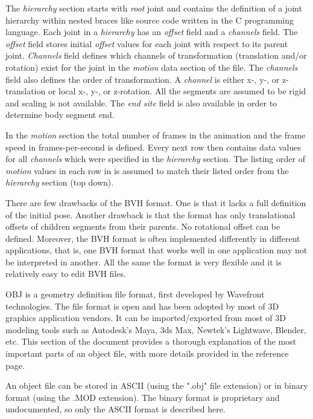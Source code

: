 \documentclass[times, 10pt,twocolumn]{article}
\begin{document}
The \emph{hierarchy} section starts with \emph{root} joint and contains the definition of a joint hierarchy within nested braces like source code written in the C programming language.
Each joint in a \emph{hierarchy} has an \emph{offset} field and a \emph{channels} field.
The \emph{offset} field stores initial \emph{offset} values for each joint with respect to its parent joint.
\emph{Channels} field defines which channels of transformation (translation and/or rotation) exist for the joint in
the \emph{motion} data section of the file. The \emph{channels} field also defines the order of transformation. A
\emph{channel} is either x-, y-, or z-translation or local x-, y-, or z-rotation. All the segments are assumed
to be rigid and scaling is not available.
The \emph{end site} field is also available in order to determine body segment end.

In the \emph{motion} section the total number of frames in the animation and the frame
speed in frames-per-second is defined. Every next row then contains data values for all \emph{channels} which were specified in the \emph{hierarchy} section.
The listing order of \emph{motion} values in each row in is assumed to match their listed order from the \emph{hierarchy} section (top down).

There are few drawbacks of the BVH format. One is that it lacks a full definition of the initial pose. Another
drawback is that the format has only translational offsets of children segments from their parents. No
rotational offset can be defined. Moreover, the BVH format is often implemented differently in different
applications, that is, one BVH format that works well in one application may not be interpreted
in another. All the same the format is very flexible and it is relatively easy to edit BVH files.


OBJ is a geometry definition file format, first developed by Wavefront technologies. The file format is open and has been adopted by most of 3D graphics application vendors. It can be imported/exported from most of 3D modeling tools such as Autodesk's Maya, 3ds Max, Newtek's Lightwave, Blender, etc.  This section of the document provides a  thorough explanation of the most important parts of an object file, with more details provided in the reference page.

An object file can be stored in ASCII (using the ".obj" file extension) or in binary format (using the .MOD extension). The binary format is proprietary and undocumented, so only the ASCII format is described here.
\end{document}
